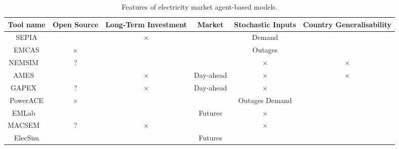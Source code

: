 \begin{table*}[]
	\centering
	\begin{adjustbox}{angle=90}
		\begin{tabular}{cccccc}
			
			\multicolumn{1}{c}{\textbf{Tool name}} & \textbf{Open Source} & \textbf{Long-Term Investment} & \textbf{Market} & \textbf{Stochastic Inputs} & \textbf{Country Generalisability} \\ \midrule
			SEPIA \cite{Harp2000}  & \checkmark           & $\times$                             & \checkmark      & Demand                     & \checkmark                        \\ 
			EMCAS \cite{Conzelmann}   & $\times$                    & \checkmark                    & \checkmark      & Outages                    & \checkmark                        \\ 
			NEMSIM ~\cite{Batten2006}  & ?              & \checkmark                    & \checkmark      & $\times$                          & $\times$                                 \\ 
			AMES  ~\cite{Sun2007} & \checkmark           & $\times$                             & Day-ahead       & $\times$                          & $\times$                                 \\ 
			GAPEX  ~\cite{Cincotti2013} & ?              & $\times$                             & Day-ahead       & $\times$                          & \checkmark                        \\ 
			PowerACE \cite{Rothengatter2007} & $\times$                    & \checkmark                    & \checkmark      & Outages Demand             & \checkmark                        \\ 
			
			EMLab ~\cite{Chappin2017}  & \checkmark           & \checkmark                    & Futures         & $\times$                          & \checkmark                        \\ 
			MACSEM  ~\cite{Praca2003}  & ?              & $\times$                             & \checkmark      & $\times$                          & \checkmark                        \\ 
			ElecSim                                  & \checkmark           & \checkmark                    & Futures         & \checkmark                 & \checkmark                        \\ \hline
		\end{tabular}
	\end{adjustbox}
	\caption{Features of electricity market agent-based models.}
	\label{table:litreview:abm_comparison}
\end{table*}


